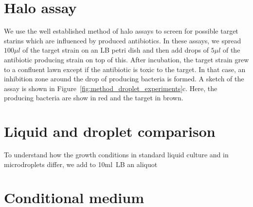 \section{Halo assay}
We use the well established method of halo assays to screen for possible target starins which are influenced by produced antibiotics. In these assays, we spread $100\mu l$ of the target strain on an LB petri dish and then add drops of $5\mu l$ of the antibiotic producing strain on top of this. After incubation, the target strain grew to a confluent lawn except if the antibiotic is toxic to the target. In that case, an inhibition zone around the drop of producing bacteria is formed. A sketch of the assay is shown in Figure~\ref{fig:method_droplet_experiments}c. Here, the producing bacteria are show in red and the target in brown.  

\section{Liquid and droplet comparison}
To understand how the growth conditions in standard liquid culture and in microdroplets differ, we add to 10ml~\gls{LB} an aliquot  

\section{Conditional medium}